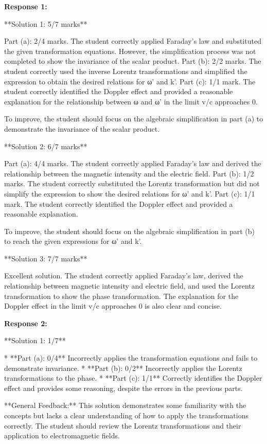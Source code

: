 \documentclass[a4paper,11pt]{article}
\begin{document}
\textbf{Response 1:}

**Solution 1: 5/7 marks**

Part (a): 2/4 marks. The student correctly applied Faraday's law and substituted the given transformation equations. However, the simplification process was not completed to show the invariance of the scalar product.
Part (b): 2/2 marks. The student correctly used the inverse Lorentz transformations and simplified the expression to obtain the desired relations for ω' and k'.
Part (c): 1/1 mark. The student correctly identified the Doppler effect and provided a reasonable explanation for the relationship between ω and ω' in the limit v/c approaches 0.

To improve, the student should focus on the algebraic simplification in part (a) to demonstrate the invariance of the scalar product.

**Solution 2: 6/7 marks**

Part (a): 4/4 marks. The student correctly applied Faraday's law and derived the relationship between the magnetic intensity and the electric field.
Part (b): 1/2 marks. The student correctly substituted the Lorentz transformation but did not simplify the expression to show the desired relations for ω' and k'.
Part (c): 1/1 mark. The student correctly identified the Doppler effect and provided a reasonable explanation.

To improve, the student should focus on the algebraic simplification in part (b) to reach the given expressions for ω' and k'.

**Solution 3: 7/7 marks**

Excellent solution. The student correctly applied Faraday's law, derived the relationship between magnetic intensity and electric field, and used the Lorentz transformation to show the phase transformation. The explanation for the Doppler effect in the limit v/c approaches 0 is also clear and concise.


\textbf{Response 2:}

**Solution 1: 1/7**

*   **Part (a): 0/4** Incorrectly applies the transformation equations and fails to demonstrate invariance.
*   **Part (b): 0/2** Incorrectly applies the Lorentz transformations to the phase.
*   **Part (c): 1/1** Correctly identifies the Doppler effect and provides some reasoning, despite the errors in the previous parts.

**General Feedback:** This solution demonstrates some familiarity with the concepts but lacks a clear understanding of how to apply the transformations correctly. The student should review the Lorentz transformations and their application to electromagnetic fields.
\end{document}
